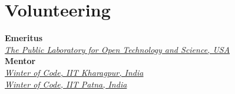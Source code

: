 \documentclass[]{rexagod-resume-openfont}
\begin{document}
\begin{minipage}[t]{0.33\textwidth}

\section{Volunteering}
\textbf{Emeritus} \\
\textbullet{} \href{\publicLabPeopleUrl}{\emph{The Public Laboratory for Open Technology and Science, USA}} \\
\textbf{Mentor} \\
\textbullet{} \href{\kwocIitKgpUrl}{\emph{Winter of Code, IIT Kharagpur, India}} \\
\textbullet{} \href{\winterOfCodeIitPatnaUrl}{\emph{Winter of Code, IIT Patna, India}}

%
%

\end{minipage} 
\hfill
\end{document}
